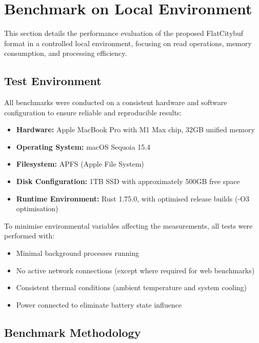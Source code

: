 \section{Benchmark on Local Environment}
\label{result:benchmark_on_local_environment}

This section details the performance evaluation of the proposed FlatCitybuf format in a controlled local environment, focusing on read operations, memory consumption, and processing efficiency.

\subsection{Test Environment}
\label{result:benchmark_on_local_environment:test_environment}

All benchmarks were conducted on a consistent hardware and software configuration to ensure reliable and reproducible results:

\begin{itemize}
  \item \textbf{Hardware:} Apple MacBook Pro with M1 Max chip, 32GB unified memory
  \item \textbf{Operating System:} macOS Sequoia 15.4
  \item \textbf{Filesystem:} APFS (Apple File System)
  \item \textbf{Disk Configuration:} 1TB SSD with approximately 500GB free space
  \item \textbf{Runtime Environment:} Rust 1.75.0, with optimised release builds (-O3 optimisation)
\end{itemize}

To minimise environmental variables affecting the measurements, all tests were performed with:
\begin{itemize}
  \item Minimal background processes running
  \item No active network connections (except where required for web benchmarks)
  \item Consistent thermal conditions (ambient temperature and system cooling)
  \item Power connected to eliminate battery state influence
\end{itemize}

\subsection{Benchmark Methodology}
\label{result:benchmark_on_local_environment:benchmark_methodology}

